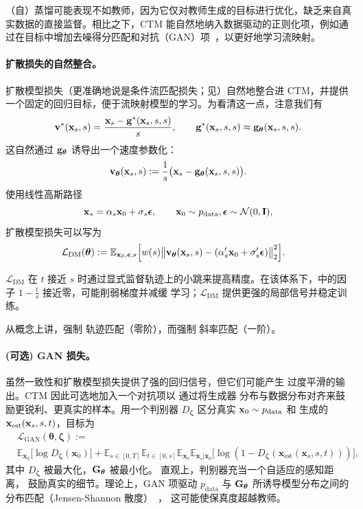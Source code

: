 （自）蒸馏可能表现不如教师，因为它仅对教师生成的目标进行优化，缺乏来自真实数据的直接监督。相比之下，CTM 能自然地纳入数据驱动的正则化项，例如通过在目标中增加去噪得分匹配和对抗（GAN）项~\citep{goodfellow2014generative}，以更好地学习流映射。

\paragraph{扩散损失的自然整合。}
扩散模型损失（更准确地说是条件流匹配损失；见）自然地整合进 CTM，并提供一个固定的回归目标，便于流映射模型的学习。为看清这一点，注意我们有
\[
{\mathbf{v}}^*({\mathbf{x}}_s, s)
= \frac{{\mathbf{x}}_s - {\mathbf{g}}^*({\mathbf{x}}_s, s, s)}{s},
\qquad
{\mathbf{g}}^*({\mathbf{x}}_s, s, s) \approx {\mathbf{g}}_{{\bm{\theta}}}({\mathbf{x}}_s, s, s).
\]
这自然通过 ${\mathbf{g}}_{{\bm{\theta}}}$ 诱导出一个速度参数化：
\[
{\mathbf{v}}_{{\bm{\theta}}}({\mathbf{x}}_s, s)
:= \frac{1}{s}\bigl({\mathbf{x}}_s - {\mathbf{g}}_{{\bm{\theta}}}({\mathbf{x}}_s, s, s)\bigr).
\]
使用线性高斯路径
\[
{\mathbf{x}}_s = \alpha_s {\mathbf{x}}_0 + \sigma_s {\bm{\epsilon}},
\qquad
{\mathbf{x}}_0 \sim p_{\mathrm{data}},
{\bm{\epsilon}} \sim \mathcal N(0, \mathbf I),
\]
扩散模型损失可以写为
\begin{align}\label{eq:ctm-dsm}
\mathcal L_{\mathrm{DM}}({\bm{\theta}})
&:= 
\mathbb{E}_{{\mathbf{x}}_0, {\bm{\epsilon}}, s}
\Bigl[
w(s)
\bigl\|
 {\mathbf{v}}_{{\bm{\theta}}}({\mathbf{x}}_s, s) - \left(\alpha_s' {\mathbf{x}}_0 + \sigma_s' {\bm{\epsilon}}\right)
\bigr\|_2^2
\Bigr].
\end{align}



$\mathcal L_{\mathrm{DM}}$ 在 $t$ 接近 $s$ 时通过显式监督轨迹上的小跳来提高精度。在该体系下，中的因子 $1-\tfrac{t}{s}$
接近零，可能削弱梯度并减缓
学习；$\mathcal L_{\mathrm{DM}}$ 提供更强的局部信号并稳定训练。

从概念上讲，强制
轨迹匹配（零阶），而强制
斜率匹配（一阶）。

\paragraph{(可选) GAN 损失。}
虽然一致性和扩散模型损失提供了强的回归信号，但它们可能产生
过度平滑的输出。CTM 因此可选地加入一个对抗项以
通过将生成器
分布与数据分布对齐来鼓励更锐利、更真实的样本。用一个判别器
$D_{\bm{\zeta}}$ 区分真实 ${\mathbf{x}}_{0}\sim p_{\mathrm{data}}$ 和
生成的 ${\mathbf{x}}_{\mathrm{est}}({\mathbf{x}}_{s},s,t)$，目标为
\begin{align*}
&\mathcal{L}_{\mathrm{GAN}}(\bm{\theta}, \bm{\zeta}) := \\ &\mathbb{E}_{\mathbf{x}_0} \big[\log D_{\bm{\zeta}}(\mathbf{x}_0)\big] + \mathbb{E}_{s \in [0, T]} \mathbb{E}_{t \in [0, s]} \mathbb{E}_{\mathbf{x}_0} \mathbb{E}_{\mathbf{x}_s \vert \mathbf{x}_0} \big[\log (1 - D_{\bm{\zeta}}( \mathbf{x}_{\mathrm{est}}(\mathbf{x}_s, s, t)))\big], \end{align*}
其中 $D_{\bm{\zeta}}$ 被最大化，${\mathbf{G}}_{\bm{\theta}}$ 被最小化。
直观上，判别器充当一个自适应的感知距离，
鼓励真实的细节。理论上，GAN 项驱动
$p_{\mathrm{data}}$ 与 ${\mathbf{G}}_{\bm{\theta}}$ 所诱导模型分布之间的
分布匹配（Jensen-Shannon 散度）~\citep{goodfellow2014generative}，
这可能使保真度超越教师。

